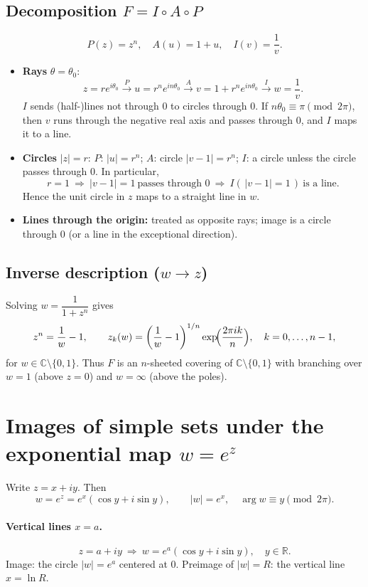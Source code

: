 \documentclass[12pt,a4paper]{article}
\newcommand{\C}{\mathbb{C}}
\newcommand{\R}{\mathbb{R}}
\begin{document}
\subsection*{Decomposition \(F=I\circ A\circ P\)}
\[
P(z)=z^{n},\quad A(u)=1+u,\quad I(v)=\frac{1}{v}.
\]
\begin{itemize}
	\item \textbf{Rays} \(\theta=\theta_{0}\):
	\[
	z=re^{i\theta_{0}}
	\xrightarrow{P} u=r^{n}e^{in\theta_{0}}
	\xrightarrow{A} v=1+r^{n}e^{in\theta_{0}}
	\xrightarrow{I} w=\frac{1}{v}.
	\]
	\(I\) sends (half-)lines not through \(0\) to circles through \(0\).  
	If \(n\theta_{0}\equiv\pi\pmod{2\pi}\), then \(v\) runs through the negative real axis and passes through \(0\), and \(I\) maps it to a line.
	\item \textbf{Circles} \(|z|=r\):
	\(P\): \(|u|=r^{n}\); \(A\): circle \(|v-1|=r^{n}\);
	\(I\): a circle unless the circle passes through \(0\).  
	In particular,
	\[
	r=1\ \Longrightarrow\ |v-1|=1\ \text{passes through }0
	\ \Longrightarrow\ I(\,|v-1|=1\,)\ \text{is a line}.
	\]
	Hence the unit circle in \(z\) maps to a straight line in \(w\).
	\item \textbf{Lines through the origin:} treated as opposite rays; image is a circle through \(0\) (or a line in the exceptional direction).
\end{itemize}

\subsection*{Inverse description (\(w\to z\))}
Solving \(w=\dfrac{1}{1+z^{n}}\) gives
\[
z^{n}=\frac{1}{w}-1,\qquad
z_k(w)=\biggl(\frac{1}{w}-1\biggr)^{1/n} \exp\!\Bigl(\frac{2\pi i k}{n}\Bigr),
\quad k=0,\dots,n-1,
\]
for \(w\in\C\setminus\{0,1\}\). Thus \(F\) is an \(n\)-sheeted covering of \(\C\setminus\{0,1\}\) with branching over \(w=1\) (above \(z=0\)) and \(w=\infty\) (above the poles).


\section*{Images of simple sets under the exponential map \(w=e^{z}\)}

Write \(z=x+iy\). Then
\[
w=e^{z}=e^{x}(\cos y+i\sin y),\qquad |w|=e^{x},\quad \arg w \equiv y \pmod{2\pi}.
\]

\paragraph{Vertical lines \(x=a\).}
\[
z=a+iy\ \Rightarrow\ w=e^{a}(\cos y+i\sin y),\quad y\in\R.
\]
Image: the circle \(|w|=e^{a}\) centered at \(0\).
Preimage of \(|w|=R\): the vertical line \(x=\ln R\).
\end{document}

